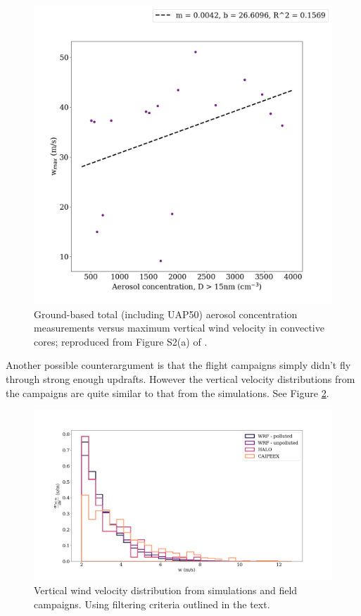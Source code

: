 \documentclass{article}
\begin{document}
\begin{figure}[ht]
    \centering
    \includegraphics[width=12cm]{revhalo/v1_FINAL_fan_fig_s2a.png}
    \caption{Ground-based total (including UAP50) aerosol concentration measurements versus maximum vertical wind velocity in convective cores; reproduced from Figure S2(a) of \cite{Fan2018}.}
    \label{fans2a}
\end{figure}

Another possible counterargument is that the flight campaigns simply didn't fly through strong enough updrafts. However the vertical velocity distributions from the campaigns are quite similar to that from the simulations. See Figure \ref{combinedwhist}. 

\begin{figure}[ht]
    \centering
    \includegraphics[width=12cm]{revmywrf/v2_FINAL_combined_w_hist_figure.png}
    \caption{Vertical wind velocity distribution from simulations and field campaigns. Using filtering criteria outlined in the text.}
    \label{combinedwhist}
\end{figure}
\end{document}
